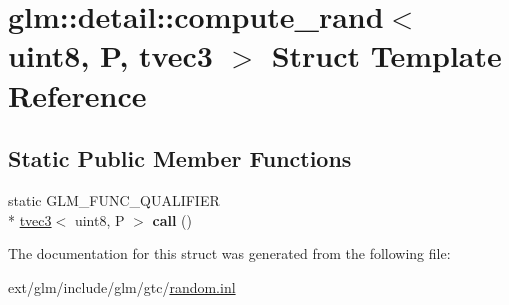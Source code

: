 \hypertarget{structglm_1_1detail_1_1compute__rand_3_01uint8_00_01_p_00_01tvec3_01_4}{\section{glm\-:\-:detail\-:\-:compute\-\_\-rand$<$ uint8, P, tvec3 $>$ Struct Template Reference}
\label{structglm_1_1detail_1_1compute__rand_3_01uint8_00_01_p_00_01tvec3_01_4}
}
\subsection*{Static Public Member Functions}
\begin{DoxyCompactItemize}
\item 
\hypertarget{structglm_1_1detail_1_1compute__rand_3_01uint8_00_01_p_00_01tvec3_01_4_a6c86825a493fcef72cb61f2ed94a2b52}{static G\-L\-M\-\_\-\-F\-U\-N\-C\-\_\-\-Q\-U\-A\-L\-I\-F\-I\-E\-R \\*
\hyperlink{structglm_1_1tvec3}{tvec3}$<$ uint8, P $>$ {\bfseries call} ()}\label{structglm_1_1detail_1_1compute__rand_3_01uint8_00_01_p_00_01tvec3_01_4_a6c86825a493fcef72cb61f2ed94a2b52}

\end{DoxyCompactItemize}


The documentation for this struct was generated from the following file\-:\begin{DoxyCompactItemize}
\item 
ext/glm/include/glm/gtc/\hyperlink{random_8inl}{random.\-inl}\end{DoxyCompactItemize}
